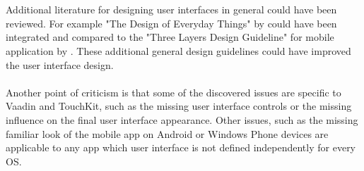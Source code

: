 \\
\\
Additional literature for designing user interfaces in general could have been reviewed. For example "The Design of Everyday Things" by \cite{Norman2002} could have been integrated and compared to the "Three Layers Design Guideline" for mobile application by \cite{AyobNurulZakiahbinti.2009}. These additional general design guidelines could have improved the user interface design.
\\
\\
Another point of criticism is that some of the discovered issues are specific to Vaadin and TouchKit, such as the missing user interface controls or the missing influence on the final user interface appearance. Other issues, such as the missing familiar look of the mobile app on Android or Windows Phone devices are applicable to any app which user interface is not defined independently for every OS.